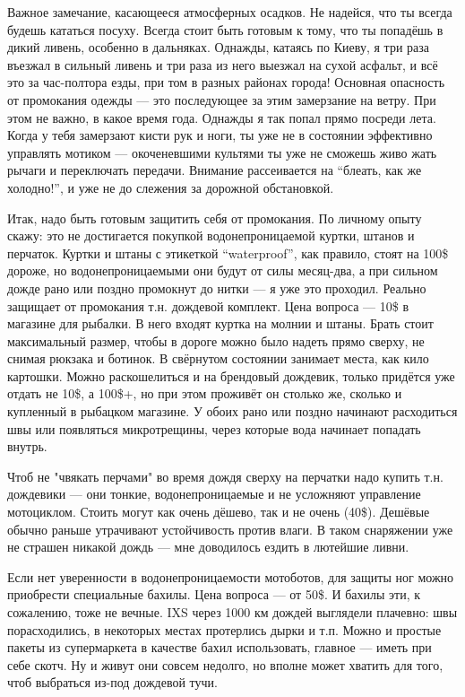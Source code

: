\documentclass[12pt,a4paper]{article}
\begin{document}
Важное замечание, касающееся атмосферных осадков. Не надейся, что ты
всегда будешь кататься посуху. Всегда стоит быть готовым к тому, что
ты попадёшь в дикий ливень, особенно в дальняках. Однажды, катаясь
по Киеву, я три раза въезжал в сильный ливень и три раза из него выезжал
на сухой асфальт, и всё это за час-полтора езды, при том в разных
районах города! Основная опасность от промокания одежды --- это
последующее за этим замерзание на ветру. При этом не важно, в какое
время года. Однажды я так попал прямо посреди лета. Когда у тебя
замерзают кисти рук и ноги, ты уже не в состоянии эффективно управлять
мотиком --- окоченевшими культями ты уже не сможешь живо жать рычаги и
переключать передачи. Внимание рассеивается на ``блеать, как же
холодно!'', и уже не до слежения за дорожной обстановкой.

Итак, надо быть готовым защитить себя от промокания. По личному опыту
скажу: это не достигается покупкой водонепроницаемой куртки, штанов и
перчаток. Куртки и штаны с этикеткой ``waterproof'', как правило, стоят
на 100\$ дороже, но водонепроницаемыми они будут от силы месяц-два, а
при сильном дожде рано или поздно промокнут до нитки --- я уже это
проходил. Реально защищает от промокания т.н. дождевой комплект. Цена
вопроса --- 10\$ в магазине для рыбалки. В него входят куртка на
молнии и штаны. Брать стоит максимальный размер, чтобы в дороге можно
было надеть прямо сверху, не снимая рюкзака и ботинок. В свёрнутом
состоянии занимает места, как кило картошки. Можно раскошелиться и на
брендовый дождевик, только придётся уже отдать не 10\$, а 100\$+, но
при этом проживёт он столько же, сколько и купленный в рыбацком магазине.
У обоих рано или поздно начинают расходиться швы или появляться
микротрещины, через которые вода начинает попадать внутрь.

Чтоб не "чвякать перчами" во время дождя сверху на перчатки надо купить
т.н. дождевики --- они тонкие, водонепроницаемые и не усложняют управление
мотоциклом. Стоить могут как очень дёшево, так и не очень (40\$). Дешёвые
обычно раньше утрачивают устойчивость против влаги. В таком снаряжении уже
не страшен никакой дождь --- мне доводилось ездить в лютейшие ливни.

Если нет уверенности в водонепроницаемости мотоботов, для защиты ног
можно приобрести специальные бахилы. Цена вопроса --- от 50\$. И бахилы
эти, к сожалению, тоже не вечные. IXS через 1000 км дождей выглядели
плачевно: швы порасходились, в некоторых местах протерлись дырки и т.п.
Можно и простые пакеты из супермаркета в качестве бахил использовать,
главное --- иметь при себе скотч. Ну и живут они совсем недолго, но
вполне может хватить для того, чтоб выбраться из-под дождевой тучи.
\end{document}

